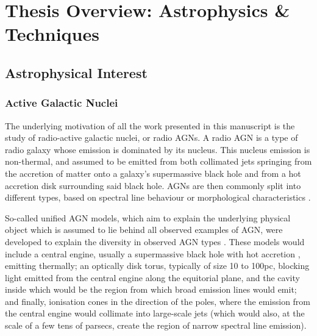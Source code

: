 \chapter{Thesis Overview: Astrophysics \& Techniques}
\minitoc

\section{Astrophysical Interest}

\subsection{Active Galactic Nuclei}


\pg
The underlying motivation of all the work presented in this manuscript is the study of radio-active galactic nuclei, or radio AGNs. A radio AGN is a type of radio galaxy whose emission is dominated by its nucleus. This nucleus emission is non-thermal, and assumed to be emitted from both collimated jets springing from the accretion of matter onto a galaxy's supermassive black hole and from a hot accretion disk surrounding said black hole. AGNs are then commonly split into different types, based on spectral line behaviour  or morphological characteristics . 

\pg
So-called unified AGN models, which aim to explain the underlying physical object which is assumed to lie behind all observed examples of AGN, were developed to explain the diversity in observed AGN types . These models would include a central engine, usually a supermassive black hole with hot accretion , emitting thermally; an optically disk torus, typically of size 10 to 100pc, blocking light emitted from the central engine along the equitorial plane, and the cavity inside which would be the region from which broad emission lines would emit; and finally, ionisation cones in the direction of the poles, where the emission from the central engine would collimate into large-scale jets (which would also, at the scale of a few tens of parsecs, create the region of narrow spectral line emission).


